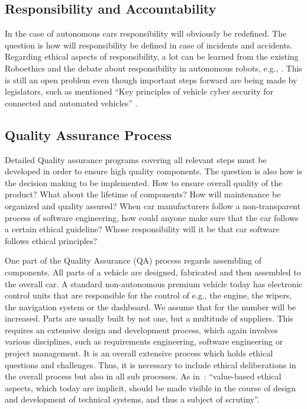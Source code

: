\subsection{Responsibility and Accountability}
\label{sec:EAofTC:ResponsibilityAndAccountability}

In the case of autonomous cars responsibility will obviously be redefined. The question is how will responsibility be defined in case of incidents and accidents. Regarding ethical aspects of responsibility, a lot can be learned from the existing Roboethics and the debate about responsibility in autonomous robots, e.g., \cite{Dodig-Crnkovic:2008:SMR:1566864.1566888}. This is still an open problem even though important steps forward are being made by legislators, such as mentioned \enquote{Key principles of vehicle cyber security for connected and automated vehicles} \cite{DepartmentforTransportDfT2017}.


\subsection{Quality Assurance Process}
\label{sec:EAofTC:QualityAssuranceProcess}

Detailed Quality assurance programs covering all relevant steps must be developed in order to ensure high quality components. The question is also how is the decision making to be implemented. How to ensure overall quality of the product? What about the lifetime of components? How will maintenance be organized and quality assured?
When car manufacturers follow a non-transparent process of software engineering, how could anyone make sure that the car follows a certain ethical guideline? Whose responsibility will it be that car software follows ethical principles?

One part of the Quality Assurance (QA) process regards assembling of components. All parts of a vehicle are designed, fabricated and then assembled to the overall car. A standard non-autonomous premium vehicle today has  electronic control units that are responsible for the control of e.g., the engine, the wipers, the navigation system or the dashboard. We assume that for  the number will be increased. Parts are usually built by not one, but a multitude of suppliers. This requires an extensive design and development process, which again involves various disciplines, such as requirements engineering, software engineering or project management. It is an overall extensive process which holds ethical questions and challenges. Thus, it is necessary to include ethical deliberations in the overall process but also in all sub processes. As  in~\cite{Sapienza2016a}: \enquote{value-based ethical aspects, which today are implicit, should be made visible in the course of design and development of technical systems, and thus a subject of scrutiny}. 

